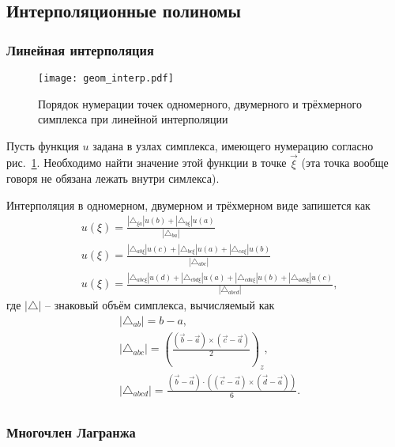 \subsection{Интерполяционные полиномы}

\subsubsection{Линейная интерполяция}
\label{sec:simplex_linear_interp}

\begin{figure}[h!]
\centering
\texttt{[image: geom\_interp.pdf]}
\caption{Порядок нумерации точек одномерного, двумерного и трёхмерного симплекса при линейной интерполяции}
\label{fig:geom_interp}
\end{figure}
Пусть функция $u$ задана в узлах симплекса, имеющего нумерацию согласно рис.~\ref{fig:geom_interp}.
Необходимо найти значение этой функции в точке $\vec \xi$ (эта точка вообще говоря не обязана лежать внутри симлекса).

Интерполяция в одномерном, двумерном и трёхмерном виде запишется как
\begin{align}
\label{eq:simplex_interp_1d}
&u(\xi) =
\frac{
|\triangle_{\xi a}|u(b)+
|\triangle_{b \xi}|u(a)
}
{|\triangle_{ba}|}
\\[10pt]
\label{eq:simplex_interp_2d}
&u(\xi) =
\frac{
|\triangle_{ab\xi}|u(c) +
|\triangle_{bc\xi}|u(a) +
|\triangle_{ca\xi}|u(b)
}
{|\triangle_{abc}|}
\\[10pt]
\label{eq:simplex_interp_3d}
&u(\xi) =
\frac{
|\triangle_{abc\xi}|u(d) +
|\triangle_{cbd\xi}|u(a) +
|\triangle_{cda\xi}|u(b) +
|\triangle_{adb\xi}|u(c)
}
{|\triangle_{abcd}|},
\end{align}
где $|\triangle|$ -- знаковый объём симплекса, вычисляемый как
\begin{align*}
& |\triangle_{ab}| = b - a, \\[10pt]
& |\triangle_{abc}| = \left(\frac{(\vec b - \vec a)\times(\vec c - \vec a)}{2}\right)_z, \\[10pt]
& |\triangle_{abcd}| = \frac{(\vec b - \vec a)\cdot\left((\vec c - \vec a)\times(\vec d - \vec a)\right)}{6}.\\[10pt]
\end{align*}

\subsubsection{Многочлен Лагранжа}


